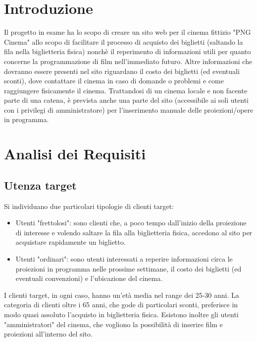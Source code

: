 \documentclass[a4paper, 12pt]{article}
\begin{document}
\makefrontpage
\tableofcontents
\clearpage

\section{Introduzione}
Il progetto in esame ha lo scopo di creare un sito web per il cinema fittizio "PNG Cinema" allo scopo di facilitare il processo di acquisto dei biglietti (saltando la fila nella biglietteria fisica) nonchè
il reperimento di informazioni utili per quanto concerne la programmazione di film nell'immediato futuro.
Altre informazioni che dovranno essere presenti nel sito riguardano il costo dei biglietti (ed eventuali sconti), dove contattare il cinema in caso di domande o problemi e come raggiungere fisicamente il cinema.
Trattandosi di un cinema locale e non facente parte di una catena, è prevista anche una parte del sito (accessibile ai soli utenti con i privilegi di amministratore) per l'inserimento manuale delle proiezioni/opere in programma.

\section{Analisi dei Requisiti}
\subsection{Utenza target}
Si individuano due particolari tipologie di clienti target:
\begin{itemize}
    \item Utenti "frettolosi": sono clienti che, a poco tempo dall'inizio della proiezione di interesse e volendo saltare la fila alla biglietteria fisica, accedono al sito per acquistare rapidamente un biglietto.
    \\\item Utenti "ordinari": sono utenti interessati a reperire informazioni circa le proiezioni in programma nelle prossime settimane, il costo dei biglietti (ed eventuali convenzioni) e l'ubicazione del cinema.
\end{itemize}
I clienti target, in ogni caso, hanno un'età media nel range dei 25-30 anni. La categoria di clienti oltre i 65 anni, che gode di particolari sconti, preferisce in modo quasi assoluto l'acquisto in biglietteria fisica.
Esistono inoltre gli utenti "amministratori" del cinema, che vogliono la possibilità di inserire film e proiezioni all'interno del sito.
\end{document}
